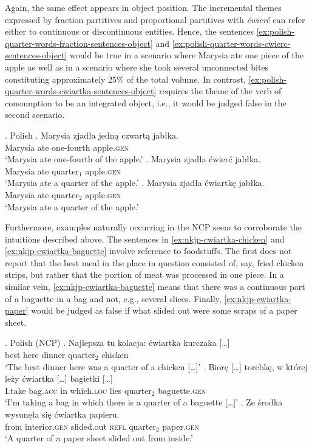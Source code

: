 Again, the same effect appears in object position. The incremental themes expressed by fraction partitives and proportional partitives with \textit{ćwierć} can refer either to continuous or discontinuous entities. Hence, the sentences \ref{ex:polish-quarter-words-fraction-sentences-object} and \ref{ex:polish-quarter-words-cwierc-sentences-object} would be true in a scenario where Marysia ate one piece of the apple as well as in a scenario where she took several unconnected bites constituting approximately 25\% of the total volume. In contrast, \ref{ex:polish-quarter-words-cwiartka-sentences-object} requires the theme of the verb of consumption to be an integrated object, i.e., it would be judged false in the second scenario.

\ex. Polish\label{ex:polish-quarter-words-sentences-object}
\ag. Marysia zjadła {jedną czwartą} jabłka.\label{ex:polish-quarter-words-fraction-sentences-object}\\
Marysia ate one-fourth apple\textsc{.gen}\\
`Marysia ate one-fourth of the apple.'
\bg. Marysia zjadła ćwierć jabłka.\label{ex:polish-quarter-words-cwierc-sentences-object}\\
Marysia ate quarter$_1$ apple\textsc{.gen}\\
`Marysia ate a quarter of the apple.'
\bg. Marysia zjadła ćwiartkę jabłka.\label{ex:polish-quarter-words-cwiartka-sentences-object}\\
Marysia ate quarter$_2$ apple\textsc{.gen}\\
`Marysia ate a quarter of the apple.'

Furthermore, examples naturally occurring in the NCP seem to corroborate the intuitions described above. The sentences in \ref{ex:nkjp-cwiartka-chicken} and \ref{ex:nkjp-cwiartka-baguette} involve reference to foodstuffs. The first does not report that the best meal in the place in question consisted of, say, fried chicken strips, but rather that the portion of meat was processed in one piece. In a similar vein, \ref{ex:nkjp-cwiartka-baguette} means that there was a continuous part of a baguette in a bag and not, e.g., several slices. Finally, \ref{ex:nkjp-cwiartka-paper} would be judged as false if what slided out were some scraps of a paper sheet.

\ex.\label{ex:nkjp-cwiartka} Polish (NCP)
\ag. Najlepsza tu kolacja: ćwiartka kurczaka [\dots]\label{ex:nkjp-cwiartka-chicken}\\
best here dinner quarter$_2$ chicken {}\\
`The best dinner here was a quarter of a chicken [\dots]'
\bg. {Biorę [\dots]} torebkę, w której leży {ćwiartka [\dots]} {bagietki [\dots]}\label{ex:nkjp-cwiartka-baguette}\\
I.take bag\textsc{.acc} in which\textsc{.loc} lies quarter$_2$ baguette\textsc{.gen}\\
`I'm taking a bag in which there is a quarter of a baguette [\dots]'
\bg. Ze środka wysunęła się ćwiartka papieru.\label{ex:nkjp-cwiartka-paper}\\
from interior\textsc{.gen} slided.out \textsc{refl} quarter$_2$ paper\textsc{.gen}\\
`A quarter of a paper sheet slided out from inside.'

